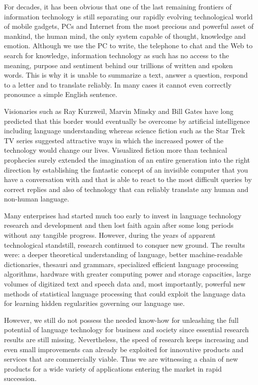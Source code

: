 \documentclass[10pt, plain]{../../metanetpaper}
\begin{document}
\begin{multicols}{2}
For decades, it has been obvious that one of the last remaining frontiers of information technology is still separating our rapidly evolving technological world of mobile gadgets, PCs and Internet from the most precious and powerful asset of mankind, the human mind, the only system capable of thought, knowledge and emotion. Although we use the PC to write, the telephone to chat and the Web to search for knowledge, information technology as such has no access to the meaning, purpose and sentiment behind our trillions of written and spoken words. This is why it is unable to summarize a text, answer a question, respond to a letter and to translate reliably. In many cases it cannot even correctly pronounce a simple English sentence.   

Visionaries such as Ray Kurzweil, Marvin Minsky and Bill Gates have long predicted that this border would eventually be overcome by artificial intelligence including language understanding whereas science fiction such as the Star Trek TV series suggested attractive ways in which the increased power of the technology would change our lives. Visualized fiction more than technical prophecies surely extended the imagination of an entire generation into the right direction by establishing the fantastic concept of an invisible computer that you have a conversation with and that is able to react to the most difficult queries by correct replies and also of technology that can reliably translate any human and non-human language.

Many enterprises had started much too early to invest in language technology research and development and then lost faith again after some long periods without any tangible progress. However, during the years of apparent technological standstill, research continued to conquer new ground. The results were: a deeper theoretical understanding of language, better machine-readable dictionaries, thesauri and grammars, specialized efficient language processing algorithms, hardware with greater computing power and storage capacities, large volumes of digitized text and speech data and, most importantly, powerful new methods of statistical language processing that could exploit the language data for learning hidden regularities governing our language use.

However, we still do not possess the needed know-how for unleashing the full potential of language technology for business and society since essential research results are still missing. Nevertheless, the speed of research keeps increasing and even small improvements can already be exploited for innovative products and services that are commercially viable. Thus we are witnessing a chain of new products for a wide variety of applications entering the market in rapid succession. 


\end{multicols}
\end{document}

